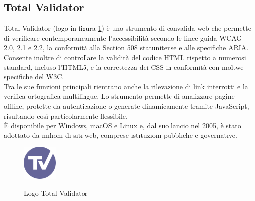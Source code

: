 \subsection{Total Validator}
\label{subsec:tv}
\noindent Total Validator (logo in figura \ref{fig:logo_TV}) è uno strumento di convalida web che permette di verificare contemporaneamente l’accessibilità secondo le linee guida WCAG 2.0, 2.1 e 2.2, la conformità alla Section 508 statunitense e alle specifiche ARIA. \\Consente inoltre di controllare la validità del codice HTML rispetto a numerosi standard, incluso l’HTML5, e la correttezza dei CSS in conformità con moltwe specifiche del W3C. \\Tra le sue funzioni principali rientrano anche la rilevazione di link interrotti e la verifica ortografica multilingue. Lo strumento permette di analizzare pagine offline, protette da autenticazione o generate dinamicamente tramite JavaScript, risultando così particolarmente flessibile. \\È disponibile per Windows, macOS e Linux e, dal suo lancio nel 2005, è stato adottato da milioni di siti web, comprese istituzioni pubbliche e governative.
\begin{figure}[H]
    \centering
    \includegraphics[width=0.15\textwidth, alt={Logo Total Validator}]{img/totalvalidator.png}
    \caption[Logo Total Validator]{Logo Total Validator}\label{fig:logo_TV}
\end{figure}

